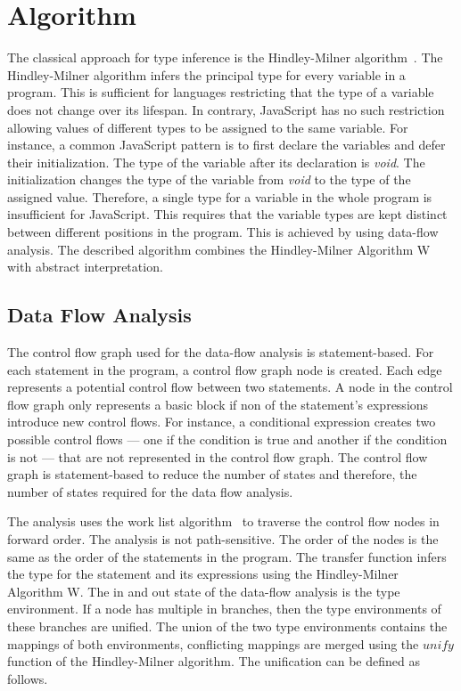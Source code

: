 \section{Algorithm}\label{sec:algorithm}
The classical approach for type inference is the Hindley-Milner algorithm~\cite{Milner1978}. The Hindley-Milner algorithm infers the principal type for every variable in a program. This is sufficient for languages restricting that the type of a variable does not change over its lifespan. In contrary, JavaScript has no such restriction allowing values of different types to be assigned to the same variable. For instance, a common JavaScript pattern is to first declare the variables and defer their initialization. The type of the variable after its declaration is \textit{void}. The initialization changes the type of the variable from \textit{void} to the type of the assigned value. Therefore, a single type for a variable in the whole program is insufficient for JavaScript. This requires that the variable types are kept distinct between different positions in the program. This is achieved by using data-flow analysis. The described algorithm combines the Hindley-Milner Algorithm W with abstract interpretation. 

\subsection{Data Flow Analysis}

The control flow graph used for the data-flow analysis is statement-based. For each statement in the program, a control flow graph node is created. Each edge represents a potential control flow between two statements. A node in the control flow graph only represents a basic block if non of the statement's expressions introduce new control flows. For instance, a conditional expression creates two possible control flows --- one if the condition is true and another if the condition is not --- that are not represented in the control flow graph. The control flow graph is statement-based to reduce the number of states and therefore, the number of states required for the data flow analysis.

The analysis uses the work list algorithm~\cite{NielsonNielsonHankin1999} to traverse the control flow nodes in forward order. The analysis is not path-sensitive. The order of the nodes is the same as the order of the statements in the program. The transfer function infers the type for the statement and its expressions using the Hindley-Milner Algorithm W.  The in and out state of the data-flow analysis is the type environment. If a node has multiple in branches, then the type environments of these branches are unified. The union of the two type environments contains the mappings of both environments, conflicting mappings are merged using the $unify$ function of the Hindley-Milner algorithm. The unification can be defined as follows.

